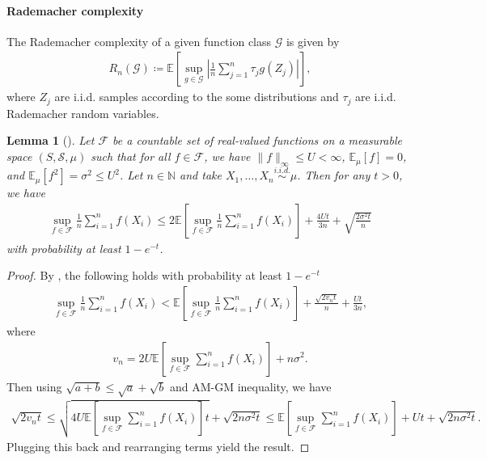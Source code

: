\documentclass{article}
\newcommand{\E}{\mathbb{E}}
\newcommand{\F}{\mathcal{F}}
\newcommand{\G}{\mathcal{G}}
\theoremstyle{plain}
\newtheorem{lemma}[theorem]{Lemma}
\theoremstyle{definition}
\theoremstyle{remark}
\begin{document}
\paragraph{Rademacher complexity} The Rademacher complexity of a given function class $\G$ is given by 
\begin{align*}
    R_n(\G) \coloneqq \E \left[\sup_{g \in \G} \left|\frac{1}{n} \sum_{j=1}^n \tau_j g(Z_j)\right|\right], 
\end{align*}
where $Z_j$ are i.i.d. samples according to the some distributions and $\tau_j$ are i.i.d. Rademacher random variables. 

\begin{lemma}[{\citep[Theorem 3.3.9]{gine2021mathematical}}] \label{talagrand's}
    Let $\F$ be a countable set of real-valued functions on a measurable space $(S, \mathcal{S}, \mu)$ such that for all $f \in \F$, we have $\|f\|_\infty \leq U < \infty$, $\E_\mu[f] = 0$, and $\E_\mu[f^2] = \sigma^2 \leq U^2$. Let $n \in \mathbb{N}$ and take $X_1, \ldots, X_n \overset{i.i.d.}{\sim} \mu$. 
    Then for any $t > 0$, we have
    \begin{align*}
        \sup_{f \in \F} \frac{1}{n} \sum_{i=1}^n f(X_i) \leq 2\E\left[\sup_{f \in \F} \frac{1}{n} \sum_{i=1}^n f(X_i)\right] + \frac{4 U t}{3 n} + \sqrt{\frac{2\sigma^2 t}{n}}
    \end{align*}
    with probability at least $1 - e^{-t}$. 
\end{lemma}
\begin{proof}
    By \citep[Theorem 3.3.9]{gine2021mathematical}, the following holds with probability at least $1 - e^{-t}$
    \begin{align*}
        \sup_{f \in \F} \frac{1}{n} \sum_{i=1}^n f(X_i) < \E\left[\sup_{f \in \F} \frac{1}{n} \sum_{i=1}^n f(X_i)\right] + \frac{\sqrt{2 v_n t}}{n} + \frac{U t}{3 n},
    \end{align*}
    where
     \begin{align*}
        v_n = 2 U \E\left[\sup_{f \in \F} \sum_{i=1}^n f(X_i)\right] + n \sigma^2. 
    \end{align*}
    Then using $\sqrt{a + b} \leq \sqrt{a} + \sqrt{b}$ and AM-GM inequality, we have 
    \begin{align*}
        \sqrt{2v_n t} \leq \sqrt{4U \E\left[\sup_{f \in \F} \sum_{i=1}^n f(X_i)\right] t } + \sqrt{2 n\sigma^2 t} \leq \E\left[\sup_{f \in \F} \sum_{i=1}^n f(X_i)\right] + Ut + \sqrt{2 n \sigma^2 t}. 
    \end{align*}
    Plugging this back and rearranging terms yield the result.
\end{proof}
\end{document}
